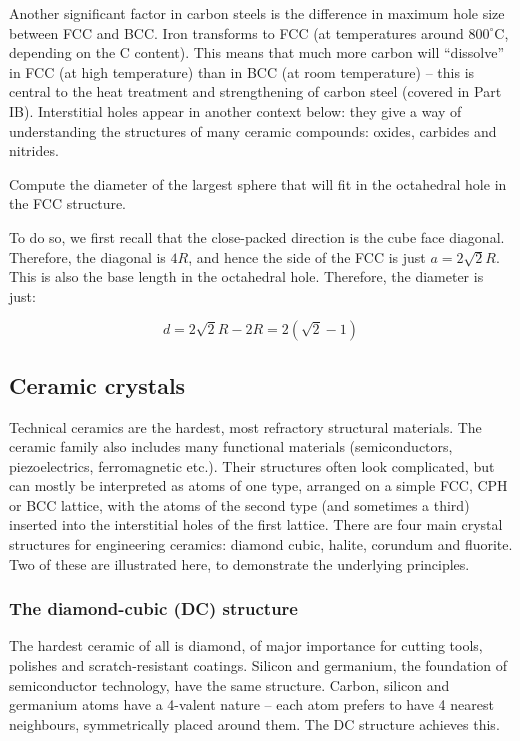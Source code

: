\documentclass{article}
\begin{document}
Another significant factor in carbon steels is the difference in maximum hole size between FCC and BCC. Iron transforms to FCC (at temperatures around $800^\circ$C, depending on the C content). This means that much more carbon will “dissolve” in FCC (at high temperature) than in BCC (at room temperature) – this is central to the heat treatment and strengthening of carbon steel (covered in Part IB). Interstitial holes appear in another context below: they give a way of understanding the structures of many ceramic compounds: oxides, carbides and nitrides.

\begin{example}
    Compute the diameter of the largest sphere that will fit in the octahedral hole in the FCC structure.

    To do so, we first recall that the close-packed direction is the cube face diagonal. Therefore, the diagonal is $4R$, and hence the side of the FCC is just $a = 2\sqrt{2}R$. This is also the base length in the octahedral hole. Therefore, the diameter is just:

    \[ d = 2\sqrt{2}R - 2R = 2(\sqrt{2} - 1) \]
\end{example}

\newpage

\subsection{Ceramic crystals}

Technical ceramics are the hardest, most refractory structural materials. The ceramic family also includes many functional materials (semiconductors, piezoelectrics, ferromagnetic etc.). Their structures often look complicated, but can mostly be interpreted as atoms of one type, arranged on a simple FCC, CPH or BCC lattice, with the atoms of the second type (and sometimes a third) inserted into the interstitial holes of the first lattice. There are four main crystal structures for engineering ceramics: diamond cubic, halite, corundum and fluorite. Two of these are illustrated here, to demonstrate the underlying principles.

\subsubsection{The diamond-cubic (DC) structure}

The hardest ceramic of all is diamond, of major importance for cutting tools, polishes and scratch-resistant coatings. Silicon and germanium, the foundation of semiconductor technology, have the same structure. Carbon, silicon and germanium atoms have a 4-valent nature – each atom prefers to have 4 nearest neighbours, symmetrically placed around them. The DC structure achieves this. 
\end{document}
